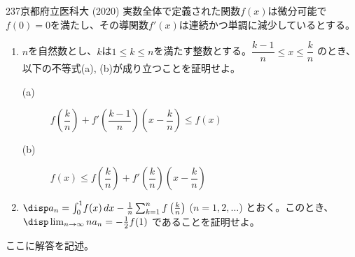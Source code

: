 \begin{prob}{237}{}{京都府立医科大 (2020)}
 実数全体で定義された関数$f(x)$は微分可能で $f(0)=0$を満たし、その導関数$f'(x)$は連続かつ単調に減少しているとする。
 \begin{enumerate}
  \item $n$を自然数とし、$k$は$1\le k\le n$を満たす整数とする。$\dfrac{k-1}{n}\le x\le\dfrac{k}{n}$ のとき、以下の不等式(a), (b)が成り立つことを証明せよ。
  \begin{description}
   \item[(a)] $f\left(\dfrac{k}{n}\right)+f'\left(\dfrac{k-1}{n}\right)\left(x-\dfrac{k}{n}\right)\le f(x)$
   \item[(b)] $f(x)\le f\left(\dfrac{k}{n}\right)+f'\left(\dfrac{k}{n}\right)\left(x-\dfrac{k}{n}\right)$
  \end{description}
  \item $\disp a_n=\int_0^1\!f(x) \,dx-\frac{1}{n}\sum_{k=1}^nf\left(\frac{k}{n}\right)$ ($n=1,2,\dots$) とおく。このとき、$\disp \lim_{n\to\infty} na_n=-\frac{1}{2}f(1)$ であることを証明せよ。
 \end{enumerate}
\end{prob}
ここに解答を記述。